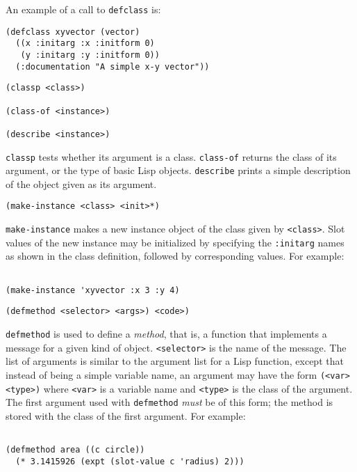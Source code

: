 An example of a call to {\tt defclass} is:
\begin{verbatim}
(defclass xyvector (vector)
  ((x :initarg :x :initform 0)
   (y :initarg :y :initform 0))
  (:documentation "A simple x-y vector"))

\end{verbatim}

\begin{verbatim}
(classp <class>)

(class-of <instance>)

(describe <instance>)

\end{verbatim}
{\tt classp} tests whether its argument is a class.  {\tt class-of} returns
the class of its argument, or the type of basic Lisp objects.  {\tt describe}
prints a simple description of the object given as its argument.

\begin{verbatim}
(make-instance <class> <init>*)

\end{verbatim}
{\tt make-instance} makes a new instance object of the class given by
{\tt <class>}.  Slot values of the new instance may be initialized by
specifying the {\tt :initarg} names as shown in the class definition,
followed by corresponding values.  For example:
\begin{verbatim}

(make-instance 'xyvector :x 3 :y 4)
\end{verbatim}

\vspace{.3in}

\begin{verbatim}
(defmethod <selector> <args>) <code>)
\end{verbatim}

{\tt defmethod} is used to define a {\it method}, that is, a function that
implements a message for a given kind of object.  {\tt <selector>} is the name
of the message.  The list of arguments is similar to the argument list for
a Lisp function, except that instead of being a simple variable name, an
argument may have the form {\tt (<var> <type>)} where {\tt <var>} is a
variable name and {\tt <type>} is the class of the argument.  The first
argument used with {\tt defmethod} {\it must} be of this form; the method
is stored with the class of the first argument.  For example:
\begin{verbatim}

(defmethod area ((c circle))
  (* 3.1415926 (expt (slot-value c 'radius) 2)))
\end{verbatim}

